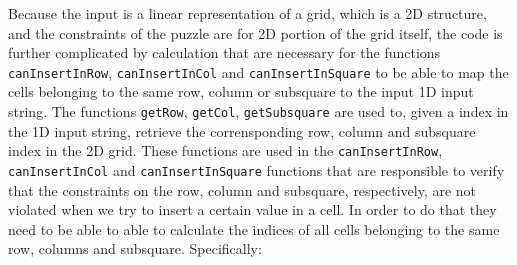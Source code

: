 Because the input is a linear representation of a grid, which is a 2D structure, and the constraints of the puzzle are for 2D portion of the grid itself,
the code is further complicated by calculation that are necessary for the functions \lstinline[columns=fixed]{canInsertInRow}, 
\lstinline[columns=fixed]{canInsertInCol} and \lstinline[columns=fixed]{canInsertInSquare}
to be able to map the cells belonging to the same row, column or subsquare to the input 1D input string.
The functions \lstinline[columns=fixed]{getRow}, \lstinline[columns=fixed]{getCol}, \lstinline[columns=fixed]{getSubsquare} are used to, given a index in the 1D input string, retrieve the 
corrensponding row, column and subsquare index in the 2D grid. These functions are used in the \lstinline[columns=fixed]{canInsertInRow}, \lstinline[columns=fixed]{canInsertInCol} and \lstinline[columns=fixed]{canInsertInSquare} functions that are responsible to 
verify that the constraints on the row, column and subsquare, respectively, are not violated when we try to insert a certain value in a cell. In order to do that they need to be able to 
able to calculate the indices of all cells belonging to the same row, columns and subsquare. 
Specifically:
